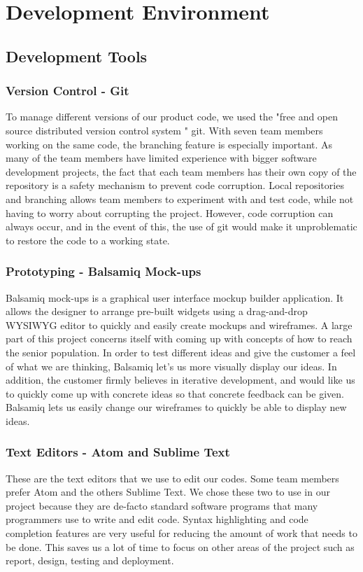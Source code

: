 \chapter{Development Environment}
\section{Development Tools}
\subsection{Version Control - Git}
To manage different versions of our product code, we used the "free and open source distributed version control system "\cite{git} git. With seven team members working on the same code, the branching feature is especially important.
As many of the team members have limited experience with bigger software development projects, the fact that each team members has their own copy of the repository is a safety mechanism to prevent code corruption. Local repositories and branching allows team members to experiment with and test code, while not having to worry about corrupting the project. 
However, code corruption can always occur, and in the event of this, the use of git would make it unproblematic to restore the code to a working state. 
\subsection{Prototyping - Balsamiq Mock-ups}
Balsamiq mock-ups is a  graphical user interface mockup builder application. It allows the designer to arrange pre-built widgets using a drag-and-drop WYSIWYG editor to quickly and easily create mockups and wireframes. A large part of this project concerns itself with coming up with concepts of how to reach the senior population. In order to test different ideas and give the customer a feel of what we are thinking, Balsamiq let’s us more visually display our ideas. In addition, the customer firmly believes in iterative development, and would like us to quickly come up with concrete ideas so that concrete feedback can be given. Balsamiq lets us easily change our wireframes to quickly be able to display new ideas. 
\subsection{Text Editors - Atom and Sublime Text}
These are the text editors that we use to edit our codes. Some team members prefer Atom and the others Sublime Text. We chose these two to use in our project because they are de-facto standard software programs that many programmers use to write and edit code. Syntax highlighting and code completion features are very useful for reducing the amount of work that needs to be done. This saves us a lot of time to focus on other areas of the project such as report, design, testing and deployment. 

